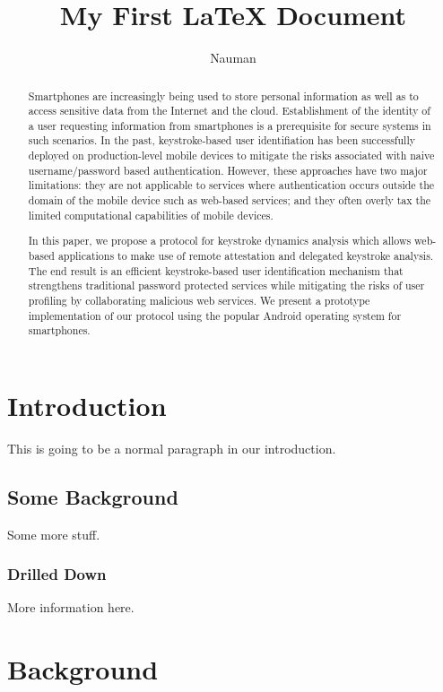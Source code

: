 \documentclass{article}
\begin{document}
\title{My First LaTeX Document}
\author{Nauman}

\maketitle
\begin{abstract}
Smartphones are increasingly being used to store personal information as well as to access sensitive data from the Internet and the cloud. Establishment of the identity of a user requesting information from smartphones is a prerequisite for  secure systems in such scenarios. In the past, keystroke-based user identifiation has been successfully deployed on production-level mobile devices to mitigate the risks associated with naive username/password based authentication. However, these approaches have two major limitations: they are not applicable to services where authentication occurs outside the domain of the mobile
device such as web-based services; and they often overly tax the limited computational capabilities of mobile devices.

In this paper, we propose a protocol for keystroke dynamics analysis which allows web-based applications to make use of remote attestation and delegated keystroke analysis. The end result is an efficient keystroke-based user identification mechanism that strengthens traditional password protected services
while mitigating the risks of user profiling by collaborating malicious web
services. We present a prototype implementation of our protocol using
the popular Android operating system for smartphones.
\end{abstract}

\section{Introduction} 
This is going to be a normal paragraph in our introduction. 

\subsection{Some Background} 
Some more stuff. 

\subsubsection{Drilled Down}\label{sec:drilled-down}
More information here. 

\section{Background}\label{sec:background}
\end{document}
